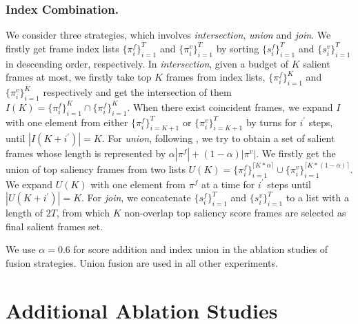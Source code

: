 \documentclass[runningheads]{llncs}
\begin{document}
\subsubsection{Index Combination.}
We consider three strategies, which involves \textit{intersection}, \textit{union} and \textit{join}. We firstly get frame index lists $\{{\pi}_i^{f}\}_{i=1}^T$ and $\{{\pi}_i^{v}\}_{i=1}^T$ by sorting $\{{s}^{f}_{i}\}_{i=1}^T$ and $\{{s}^{v}_{i}\}_{i=1}^T$ in descending order, respectively. In \textit{intersection}, given a budget of $K$ salient frames at most, we firstly take top $K$ frames from index lists, $\{{\pi}_{i}^{f}\}_{i=1}^K$ and $\{{\pi}_{i}^{v}\}_{i=1}^K$ respectively and get the intersection of them $I(K) = \{{\pi}_{i}^{f}\}_{i=1}^K \cap \{{\pi}_{i}^{f}\}_{i=1}^K$. When there exist coincident frames, we expand $I$ with one element from either $\{{\pi}_{i}^{f}\}_{i=K+1}^T$ or $\{{\pi}_{i}^{v}\}_{i=K+1}^T$ by turns for $i^{\prime}$ steps, until $|I(K+i^{\prime})|=K$. For \textit{union}, following \cite{scsampler19}, we try to obtain a set of salient frames whose length is represented by $\alpha|{\pi}^{f}|+(1-\alpha)|{\pi}^{v}|$. We firstly get the union of top saliency frames from two lists $U(K) = \{{\pi}^{f}_{i}\}_{i=1}^{\lceil K*\alpha \rceil} \cup \{{\pi}_{i}^{v}\}_{i=1}^{\lceil K*(1-\alpha) \rceil}$. We expand $U(K)$ with one element from ${\pi}^{f}$ at a time for $i^{\prime}$ steps until $|U(K+i^{\prime})|=K$. For \textit{join}, we concatenate $\{s_i^{f}\}_{i=1}^T$ and $\{s_i^{v}\}_{i=1}^T$ to a list with a length of $2T$, from which $K$ non-overlap top saliency score frames are selected as final salient frames set.

We use $\alpha=0.6$ for score addition and index union in the ablation studies of fusion strategies. Union fusion are used in all other experiments. 

\section{Additional Ablation Studies} \label{appendix:ablation}
\end{document}
